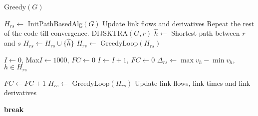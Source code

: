 \begin{algorithm}
\caption{Greedy$(G)$}
\begin{algorithmic}[1]

\STATE $H_{rs}\leftarrow$ InitPathBasedAlg$(G)$
\STATE Update link flows and derivatives
\STATE Repeat the rest of the code till convergence.
	\STATE DIJSKTRA$(G, r)$
		\STATE $\hat{h}\leftarrow$ Shortest path between $r$ and $s$
			\STATE $H_{rs}\leftarrow H_{rs}\cup \{\hat{h}\}$
		\ENDIF
		\STATE $H_{rs}\leftarrow$ GreedyLoop$(H_{rs})$
	\ENDFOR
\ENDFOR

\STATE $I\leftarrow 0$, Max$I\leftarrow 1000$, $FC\leftarrow 0$
	\STATE $I\leftarrow I+1$, $FC\leftarrow 0$
			\STATE$\Delta_{rs}\leftarrow \max{v_h}-\min{v_h}$, $h\in H_{rs}$
		\ENDIF

			\STATE $FC\leftarrow FC+1$
			\STATE $H_{rs}\leftarrow$ GreedyLoop$(H_{rs})$
			\STATE Update link flows, link times and link derivatives
		\ENDIF
	\ENDFOR

		\STATE \textbf{break}
	\ENDIF
\ENDWHILE

\end{algorithmic}
\end{algorithm}
